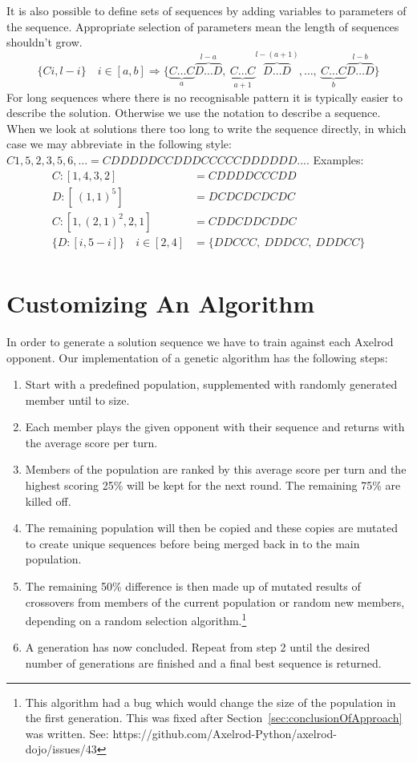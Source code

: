 It is also possible to define sets of sequences by adding variables to parameters of the sequence.
Appropriate selection of parameters mean the length of sequences shouldn't grow.
\[ \{Ci,l-i\} \quad i\in [a,b] \Rightarrow \{\underbrace{C\ldots C}_{a}\overbrace{D\ldots D}^{l-a},\ \underbrace{C\ldots C}_{a+1}\overbrace{D\ldots D}^{l-(a+1)},\ldots ,\ \underbrace{C\ldots C}_{b}\overbrace{D\ldots D}^{l-b}\} \]
For long sequences where there is no recognisable pattern it is typically easier to describe the solution.
Otherwise we use the notation to describe a sequence.
When we look at solutions there too long to write the sequence directly, in which case we may abbreviate in the following style: $C1,5,2,3,5,6,...=CDDDDDCCDDDCCCCCDDDDDD...$.
Examples:
\begin{align}
    C:[1,4,3,2] &= CDDDDCCCDD\\
    D:[\ (1,1)^{5}] &= DCDCDCDCDC\\
    C:[1,(2,1)^{2},2,1] &= CDDCDDCDDC\\
    \{D:[i,5-i]\} \quad i\in [2,4] &= \{DDCCC,\ DDDCC,\ DDDCC\}\\
\end{align}

\section{Customizing An Algorithm}\label{sec:buildingTheAlgorithm}
In order to generate a solution sequence we have to train against each Axelrod opponent.
Our implementation of a genetic algorithm has the following steps:
\begin{enumerate}
    \item Start with a predefined population, supplemented with randomly generated member until to size.
    \item Each member plays the given opponent with their sequence and returns with the average score per turn.
    \item Members of the population are ranked by this average score per turn and the highest scoring 25\% will be kept for the next round.
    The remaining 75\% are killed off.
    \item The remaining population will then be copied and these copies are mutated to create unique sequences before being merged back in to the main population.
    \item The remaining 50\% difference is then made up of mutated results of crossovers from members of the current population or random new members, depending on a random selection algorithm.\footnote{This algorithm had a bug which would change the size of the population in the first generation.
    This was fixed after Section~\ref{sec:conclusionOfApproach} was written.
    See: https://github.com/Axelrod-Python/axelrod-dojo/issues/43}
    \item A generation has now concluded.
    Repeat from step 2 until the desired number of generations are finished and a final best sequence is returned.
\end{enumerate}

